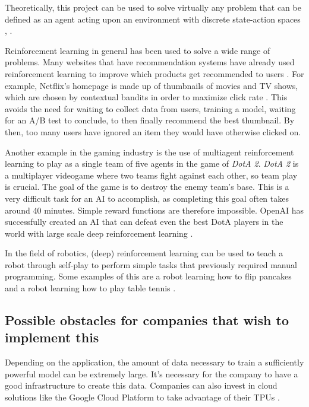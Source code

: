 \documentclass{article}
\begin{document}
Theoretically, this project can be used to solve virtually any problem that can be
defined as an agent acting upon an environment with discrete state-action spaces \cite{ReinforcementLearning2022a}, \cite{nbroAnswerAreThere2020}.

Reinforcement learning in general has been used to solve a wide range of problems.
Many websites that have recommendation systems have already used reinforcement learning 
to improve which products get recommended to users \cite{nbroAnswerAreThere2020}. 
For example, Netflix's homepage is made up of thumbnails of movies and TV shows, which are chosen 
by contextual bandits in order to maximize click rate \cite{blogArtworkPersonalizationNetflix2017,surmenokContextualBanditsReinforcement2017}.
This avoids the need for waiting to collect data from users, training a model,
waiting for an A/B test to conclude, to then finally recommend the best thumbnail.
By then, too many users have ignored an item they would have otherwise clicked on.

Another example in the gaming industry is the use of multiagent reinforcement learning 
to play as a single team of five agents in the game of \textit{DotA 2}. \textit{DotA 2} is a multiplayer videogame where 
two teams fight against each other, so team play is crucial. The goal of the game is to destroy the 
enemy team's base. This is a very difficult task for an AI to accomplish, as completing this goal often takes 
around 40 minutes. Simple reward functions are therefore impossible. OpenAI has successfully created 
an AI that can defeat even the best DotA players in the world with large scale deep reinforcement 
learning \cite{openaiDotaLargeScale2019,OpenAIFive2019}.

In the field of robotics, (deep) reinforcement learning can be used to teach a robot
through self-play to perform simple tasks that previously required manual programming.
Some examples of this are a robot learning how to flip pancakes \cite{petarkormushevRobotLearnsFlip2010}
and a robot learning how to play table tennis \cite{mpikybrollLearningRobotTable2012}.

\subsection{Possible obstacles for companies that wish to implement this}

Depending on the application, the amount of data necessary to train a sufficiently powerful model
can be extremely large. It's necessary for the company to have a good infrastructure to 
create this data. Companies can also invest in cloud solutions like the Google Cloud Platform
to take advantage of their TPUs \cite{CloudComputingServices}.
\end{document}
